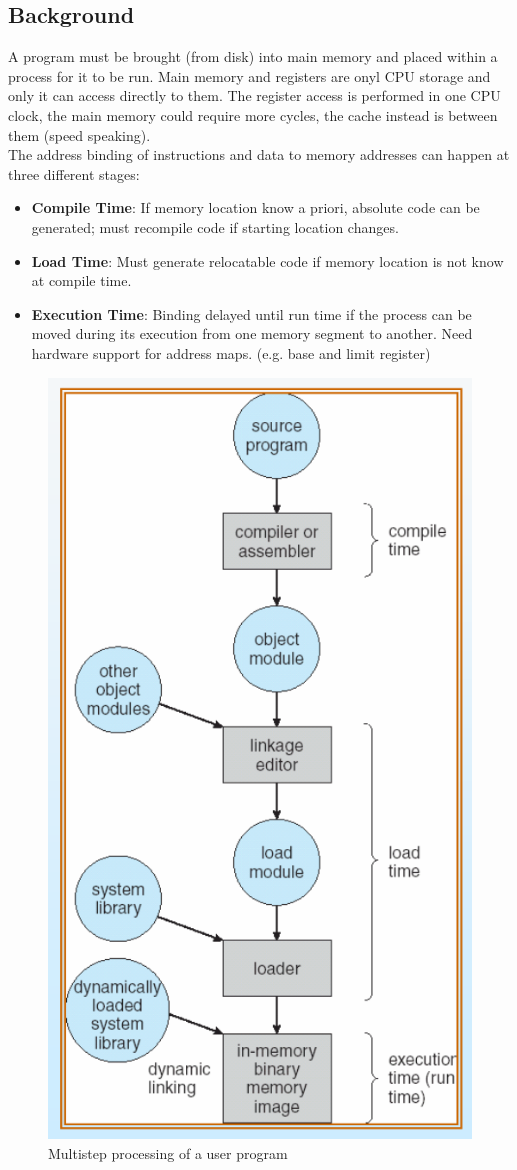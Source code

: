 \documentclass[12pt]{article}
\begin{document}
\subsection{Background}
A program must be brought (from disk) into main memory and placed within a process for it to be run. Main memory and registers are onyl CPU storage and only it can access directly to them. The register access is performed in one CPU clock, the main memory could require more cycles, the cache instead is between them (speed speaking).\\
The address binding of instructions and data to memory addresses can happen at three different stages:
\begin{itemize}
  \item \textbf{Compile Time}: If memory location know a priori, absolute code can be generated; must recompile code if starting location changes.
  \item \textbf{Load Time}: Must generate relocatable code if memory location is not know at compile time.
  \item \textbf{Execution Time}: Binding delayed until run time if the process can be moved during its execution from one memory segment to another. Need hardware support for address maps. (e.g. base and limit register)
\end{itemize}
\begin{figure}[H]
  \centering
  \includegraphics[width=0.4\linewidth]{images/multi_step_user.png}
  \caption{Multistep processing of a user program}
  \label{fig:multi_step_user}
\end{figure}
\end{document}
